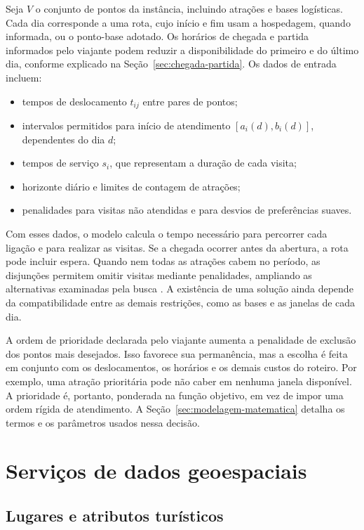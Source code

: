Seja $V$ o conjunto de pontos da instância, incluindo atrações e bases logísticas. Cada dia corresponde a uma rota, cujo início e fim usam a hospedagem, quando informada, ou o ponto-base adotado. Os horários de chegada e partida informados pelo viajante podem reduzir a disponibilidade do primeiro e do último dia, conforme explicado na Seção~\ref{sec:chegada-partida}. Os dados de entrada incluem:
\begin{itemize}
  \item tempos de deslocamento $t_{ij}$ entre pares de pontos;
  \item intervalos permitidos para início de atendimento $[a_i(d),b_i(d)]$, dependentes do dia $d$;
  \item tempos de serviço $s_i$, que representam a duração de cada visita;
  \item horizonte diário e limites de contagem de atrações;
  \item penalidades para visitas não atendidas e para desvios de preferências suaves.
\end{itemize}

Com esses dados, o modelo calcula o tempo necessário para percorrer cada ligação e para realizar as visitas. Se a chegada ocorrer antes da abertura, a rota pode incluir espera. Quando nem todas as atrações cabem no período, as disjunções permitem omitir visitas mediante penalidades, ampliando as alternativas examinadas pela busca \cite{google_penalties}. A existência de uma solução ainda depende da compatibilidade entre as demais restrições, como as bases e as janelas de cada dia.

A ordem de prioridade declarada pelo viajante aumenta a penalidade de exclusão dos pontos mais desejados. Isso favorece sua permanência, mas a escolha é feita em conjunto com os deslocamentos, os horários e os demais custos do roteiro. Por exemplo, uma atração prioritária pode não caber em nenhuma janela disponível. A prioridade é, portanto, ponderada na função objetivo, em vez de impor uma ordem rígida de atendimento. A Seção~\ref{sec:modelagem-matematica} detalha os termos e os parâmetros usados nessa decisão.

\section{Serviços de dados geoespaciais}

\subsection{Lugares e atributos turísticos}


